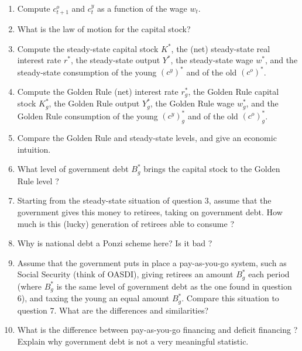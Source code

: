 \documentclass[]{book}
\theoremstyle{definition}
\theoremstyle{definition}
\theoremstyle{definition}
\theoremstyle{remark}
\begin{document}
\begin{enumerate}
\def\labelenumi{\arabic{enumi}.}
\item
  Compute \(c_{t+1}^o\) and \(c_t^y\) as a function of the wage \(w_t\).
\item
  What is the law of motion for the capital stock?
\item
  Compute the steady-state capital stock \(K^{*}\), the (net)
  steady-state real interest rate \(r^{*}\), the steady-state output
  \(Y^{*}\), the steady-state wage \(w^{*}\), and the steady-state
  consumption of the young \((c^y)^{*}\) and of the old \((c^o)^{*}\).
\item
  Compute the Golden Rule (net) interest rate \(r^{*}_g\), the Golden
  Rule capital stock \(K^{*}_g\), the Golden Rule output \(Y^{*}_g\),
  the Golden Rule wage \(w^{*}_g\), and the Golden Rule consumption of
  the young \((c^y)^{*}_g\) and of the old \((c^o)^{*}_g\).
\item
  Compare the Golden Rule and steady-state levels, and give an economic
  intuition.
\item
  What level of government debt \(B^{*}_g\) brings the capital stock to
  the Golden Rule level ?
\item
  Starting from the steady-state situation of question 3, assume that
  the government gives this money to retirees, taking on government
  debt. How much is this (lucky) generation of retirees able to consume
  ?
\item
  Why is national debt a Ponzi scheme here? Is it bad ?
\item
  Assume that the government puts in place a pay-as-you-go system, such
  as Social Security (think of OASDI), giving retirees an amount
  \(B^{*}_g\) each period (where \(B^{*}_g\) is the same level of
  government debt as the one found in question 6), and taxing the young
  an equal amount \(B^{*}_g\). Compare this situation to question 7.
  What are the differences and similarities?
\item
  What is the difference between pay-as-you-go financing and deficit
  financing ? Explain why government debt is not a very meaningful
  statistic.
\end{enumerate}


\end{document}
